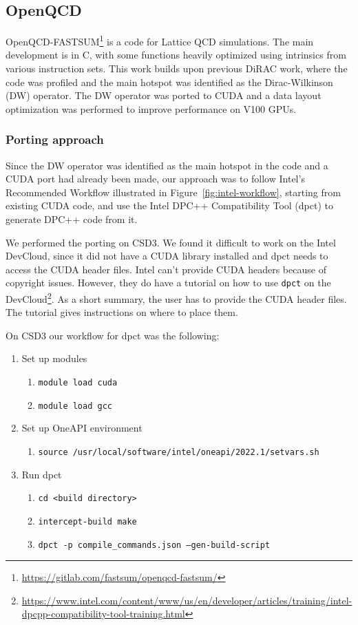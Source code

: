\documentclass[../main]{subfiles}
\begin{document}
\subsection{OpenQCD}\label{sec:openqcd}

OpenQCD-FASTSUM\footnote{\url{https://gitlab.com/fastsum/openqcd-fastsum/}} is a code for Lattice QCD simulations.
The main development is in C, with some functions heavily optimized using intrinsics from various instruction sets.
This work builds upon previous DiRAC work, where the code was profiled and the main hotspot was identified as the Dirac-Wilkinson (DW) operator.
The DW operator was ported to CUDA and a data layout optimization was performed to improve performance on V100 GPUs.

\subsubsection{Porting approach}\label{sec:openqcd_porting}

Since the DW operator was identified as the main hotspot in the code and a CUDA port had already been made, our approach was to follow Intel's Recommended Workflow illustrated in Figure~\ref{fig:intel-workflow}, starting from existing CUDA code, and use the Intel DPC++ Compatibility Tool (dpct) to generate DPC++ code from it.

We performed the porting on CSD3.
We found it difficult to work on the Intel DevCloud, since it did not have a CUDA library installed and dpct needs to access the CUDA header files.
Intel can't provide CUDA headers because of copyright issues. However, they do have a tutorial on how to use \texttt{dpct} on the DevCloud\footnote{\url{https://www.intel.com/content/www/us/en/developer/articles/training/intel-dpcpp-compatibility-tool-training.html}}.
As a short summary, the user has to provide the CUDA header files. The tutorial gives instructions on where to place them.

On CSD3 our workflow for dpct was the following:

\begin{enumerate}
	\item Set up modules
	      \begin{enumerate}
		      \item\texttt{module load cuda}
		      \item\texttt{module load gcc}
	      \end{enumerate}
	\item Set up OneAPI environment
	      \begin{enumerate}
		      \item\texttt{source /usr/local/software/intel/oneapi/2022.1/setvars.sh}
	      \end{enumerate}
	\item Run dpct
	      \begin{enumerate}
		      \item\texttt{cd <build directory>}
		      \item\texttt{intercept-build make}
		      \item\texttt{dpct -p compile\_commands.json --gen-build-script}
	      \end{enumerate}
\end{enumerate}
\end{document}
